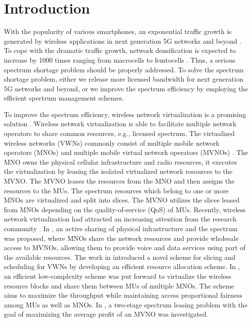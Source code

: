 \documentclass[journal]{IEEEtran}
\begin{document}
\section{Introduction}

With the popularity of various {\color{red} smartphones}, an exponential traffic growth is generated by wireless applications in next generation 5G networks and beyond \cite{NPanwar,DingZ14,LiY17,LiY18}. To cope with the dramatic traffic growth, network densification is expected to increase by 1000 times ranging from macrocells to femtocells \cite{AYDing}. Thus, a serious spectrum shortage problem should be properly addressed. To solve the spectrum shortage problem, either we release more licensed bandwidth for next generation 5G networks and beyond, or we improve the spectrum efficiency by employing the efficient spectrum management schemes.

To improve the spectrum efficiency, wireless network virtualization is a promising solution \cite{CLiang,LZhao,3GPP}. Wireless network virtualization is able to facilitate multiple network operators to share common resources, e.g., licensed spectrum. The virtualized wireless networks (VWNs) commonly consist of multiple mobile network operators (MNOs) and multiple mobile virtual network operators (MVNOs) \cite{RKokku}. The MNO owns the physical cellular infrastructure and radio resources, it executes the virtualization by leasing the isolated virtualized network resources to the MVNO. The MVNO leases the resources from the MNO and then assigns the resources to the MUs. The spectrum resources which belong to one or more MNOs are virtualized and split into slices. The MVNO utilizes the slices leased from MNOs depending on the quality-of-service (QoS) of MUs. Recently, wireless network virtualization had attracted an increasing attention from the research community \cite{XCostaPerez,MIKamel,MKalil,YXZhang}. In \cite{XCostaPerez}, an active sharing of physical infrastructure and the spectrum was proposed, where MNOs share the network resources and provide wholesale access to MVNOs, allowing them to provide voice and data services using part of the available resources. The work in \cite{MIKamel} introduced a novel scheme for slicing and scheduling for VWNs by developing an efficient resource allocation scheme. In \cite{MKalil}, an efficient low-complexity scheme was put forward to virtualize the wireless resource blocks and share them between MUs of multiple MNOs. The scheme aims to maximize the throughput while maintaining access proportional fairness among MUs as well as MNOs. In \cite{YXZhang}, a two-stage spectrum leasing problem with the goal of maximizing the average profit of an MVNO was investigated.
\end{document}
